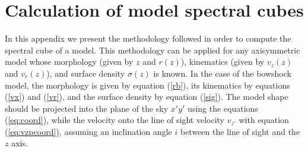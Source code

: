 \documentclass[12pt]{mythesis}
\begin{document}
\chapter{Calculation of model spectral cubes}

In this appendix we present the methodology followed in order to compute the spectral cube of a model. This methodology can be applied for any axisymmetric model whose morphology (given by $z$ and $r(z)$), kinematics (given by $v_z(z)$ and $v_r(z)$), and surface density $\sigma(z)$ is known. In the case of the bowshock model, the morphology is given by equation (\ref{rb}), its kinematics by equations (\ref{vx}) and (\ref{vr}), and the surface density by equation (\ref{sig}). The model shape should be projected into the plane of the sky $x'y'$ using the equations (\ref{eq:coord}), while the velocity onto the line of sight velocity $v_{z'}$ with equation (\ref{eq:vzpcoord}), assuming an inclination angle $i$ between the line of sight and the $z$ axis.  
\end{document}
